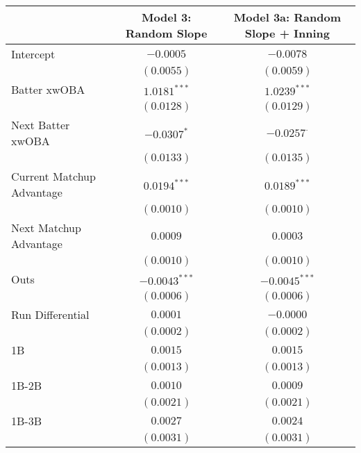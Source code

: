 
\begin{tabular}{l c c}
\toprule
 & Model 3: Random Slope & Model 3a: Random Slope + Inning \\
\midrule
Intercept                                & $-0.0005$       & $-0.0078$         \\
                                         & $(0.0055)$      & $(0.0059)$        \\
Batter xwOBA                             & $1.0181^{***}$  & $1.0239^{***}$    \\
                                         & $(0.0128)$      & $(0.0129)$        \\
Next Batter xwOBA                        & $-0.0307^{*}$   & $-0.0257^{\cdot}$ \\
                                         & $(0.0133)$      & $(0.0135)$        \\
Current Matchup Advantage                & $0.0194^{***}$  & $0.0189^{***}$    \\
                                         & $(0.0010)$      & $(0.0010)$        \\
Next Matchup Advantage                   & $0.0009$        & $0.0003$          \\
                                         & $(0.0010)$      & $(0.0010)$        \\
Outs                                     & $-0.0043^{***}$ & $-0.0045^{***}$   \\
                                         & $(0.0006)$      & $(0.0006)$        \\
Run Differential                         & $0.0001$        & $-0.0000$         \\
                                         & $(0.0002)$      & $(0.0002)$        \\
1B                                       & $0.0015$        & $0.0015$          \\
                                         & $(0.0013)$      & $(0.0013)$        \\
1B-2B                                    & $0.0010$        & $0.0009$          \\
                                         & $(0.0021)$      & $(0.0021)$        \\
1B-3B                                    & $0.0027$        & $0.0024$          \\
                                         & $(0.0031)$      & $(0.0031)$        \\

\end{tabular}
